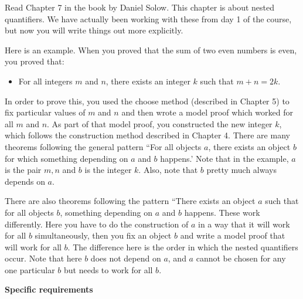 
Read Chapter 7 in the book by Daniel Solow.
This chapter is about nested quantifiers.
We have actually been working with these from day 1 of the course, but now you will write things out more explicitly.

Here is an example.
When you proved that the sum of two even numbers is even, you proved that:
\begin{itemize}
\item For all integers $m$ and $n$, there exists an integer $k$ such that $m+n = 2k$.
\end{itemize}
In order to prove this, you used the choose method (described in Chapter 5) to fix particular values of $m$ and $n$ and then wrote a model proof which worked for all $m$ and $n$.
As part of that model proof, you constructed the new integer $k$, which follows the construction method described in Chapter 4.
There are many theorems following the general pattern ``For all objects $a$, there exists an object $b$ for which something depending on $a$ and $b$ happens.'
Note that in the example, $a$ is the pair $m,n$ and $b$ is the integer $k$.
Also, note that $b$ pretty much always depends on $a$.

There are also theorems following the pattern ``There exists an object $a$ such that for all objects $b$, something depending on $a$ and $b$ happens.
These work differently.
Here you have to do the construction of $a$ in a way that it will work for all $b$ simultaneously, then you fix an object $b$ and write a model proof that will work for all $b$.
The difference here is the order in which the nested quantifiers occur.
Note that here $b$ does not depend on $a$, and $a$ cannot be chosen for any one particular $b$ but needs to work for all $b$.

\vspace{0.1in}
\noindent
{\bf Specific requirements}
\vspace*{-0.15in}

